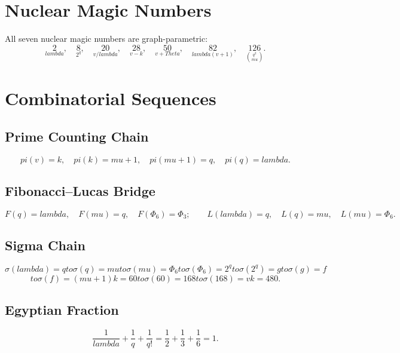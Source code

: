 \documentclass[12pt,a4paper]{article}
\def\lambda{lambda}%
\def\mu{mu}%
\def\Phi#1{Phi#1}%
\def\pi{pi}%
\def\Theta{Theta}%
\def\to{ to }%
\theoremstyle{definition}
\newcommand{\Phithree}{\Phi_3}
\newcommand{\Phisix}{\Phi_6}
\begin{document}
\section{Nuclear Magic Numbers}
\label{sec:nuclear}

All seven nuclear magic numbers are graph-parametric:
\begin{equation}
\underset{\lambda}{2},\quad
\underset{2^q}{8},\quad
\underset{v/\lambda}{20},\quad
\underset{v-k}{28},\quad
\underset{v+\Theta}{50},\quad
\underset{\lambda(v+1)}{82},\quad
\underset{\binom{q^2}{\mu}}{126}.
\end{equation}


\section{Combinatorial Sequences}
\label{sec:comb}

\subsection{Prime Counting Chain}
\begin{equation}
\pi(v)=k, \quad \pi(k)=\mu+1, \quad \pi(\mu+1)=q, \quad \pi(q)=\lambda.
\end{equation}

\subsection{Fibonacci--Lucas Bridge}
\begin{equation}
F(q)=\lambda,\quad F(\mu)=q,\quad F(\Phisix)=\Phithree;\qquad
L(\lambda)=q,\quad L(q)=\mu,\quad L(\mu)=\Phisix.
\end{equation}

\subsection{Sigma Chain}
\begin{equation}
\sigma(\lambda)=q \to \sigma(q)=\mu \to \sigma(\mu)=\Phisix
\to \sigma(\Phisix)=2^q \to \sigma(2^q)=g \to \sigma(g)=f
\end{equation}
\begin{equation}
\to \sigma(f)=(\mu+1)k=60 \to \sigma(60)=168 \to \sigma(168)=vk=480.
\end{equation}

\subsection{Egyptian Fraction}
\begin{equation}
\frac{1}{\lambda}+\frac{1}{q}+\frac{1}{q!}
= \frac{1}{2}+\frac{1}{3}+\frac{1}{6} = 1.
\end{equation}
\end{document}
